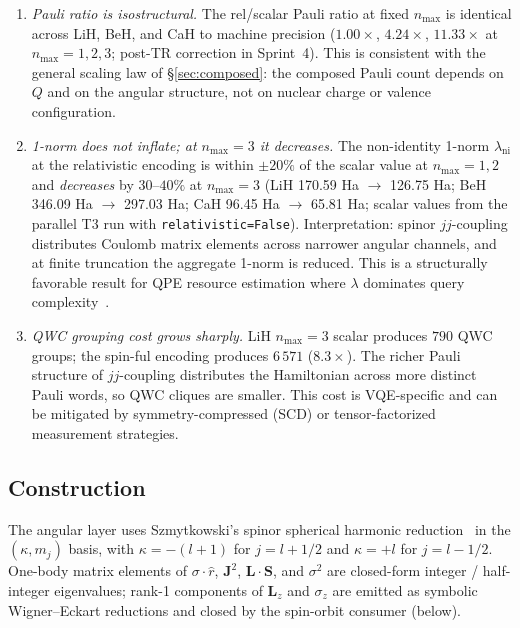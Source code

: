 \documentclass[aps,pra,twocolumn,superscriptaddress,longbibliography]{revtex4-2}
\begin{document}
\begin{enumerate}
  \item \emph{Pauli ratio is isostructural.} The rel/scalar Pauli
    ratio at fixed $n_{\max}$ is identical across LiH, BeH, and CaH
    to machine precision ($1.00\times$, $4.24\times$, $11.33\times$ at
    $n_{\max}=1,2,3$; post-TR correction in Sprint~4). This is consistent with the general scaling
    law of \S\ref{sec:composed}: the composed Pauli count depends
    on $Q$ and on the angular structure, not on nuclear charge or
    valence configuration.

  \item \emph{1-norm does not inflate; at $n_{\max}=3$ it decreases.}
    The non-identity 1-norm $\lambda_{\mathrm{ni}}$ at the
    relativistic encoding is within $\pm 20\%$ of the scalar value
    at $n_{\max}=1,2$ and \emph{decreases} by $30$--$40\%$ at
    $n_{\max}=3$ (LiH 170.59 Ha $\to$ 126.75 Ha;
    BeH 346.09 Ha $\to$ 297.03 Ha;
    CaH 96.45 Ha $\to$ 65.81 Ha; scalar values from the
    parallel T3 run with \texttt{relativistic=False}). Interpretation:
    spinor $jj$-coupling distributes Coulomb matrix elements across
    narrower angular channels, and at finite truncation the aggregate
    1-norm is reduced. This is a structurally favorable result for
    QPE resource estimation where $\lambda$ dominates query
    complexity~\cite{ChildsBerry}.

  \item \emph{QWC grouping cost grows sharply.} LiH $n_{\max}=3$
    scalar produces $790$ QWC groups; the spin-ful encoding produces
    $6\,571$ ($8.3\times$). The richer Pauli structure of $jj$-coupling
    distributes the Hamiltonian across more distinct Pauli words, so
    QWC cliques are smaller. This cost is VQE-specific and can be
    mitigated by symmetry-compressed (SCD) or tensor-factorized
    measurement strategies.
\end{enumerate}

\subsection{Construction}
\label{subsec:spinor_construction}

The angular layer uses Szmytkowski's spinor spherical harmonic
reduction~\cite{Szmytkowski2007} in the $(\kappa, m_j)$ basis,
with $\kappa = -(l+1)$ for $j = l + 1/2$ and $\kappa = +l$ for
$j = l - 1/2$. One-body matrix elements of $\sigma \cdot \hat{r}$,
$\mathbf{J}^2$, $\mathbf{L}\cdot\mathbf{S}$, and $\sigma^2$ are
closed-form integer / half-integer eigenvalues; rank-1 components of
$\mathbf{L}_z$ and $\sigma_z$ are emitted as symbolic Wigner--Eckart
reductions and closed by the spin-orbit consumer (below).
\end{document}
